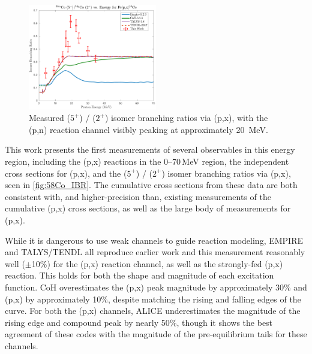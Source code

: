 \begin{figure}[h]
 \centering
 \includegraphics[width=0.5\textwidth]{./figures/58Co_IBR.pdf}
 \caption{Measured  ($5^+$) /   ($2^+$)  isomer branching ratios via (p,x), with the (p,n) reaction channel visibly peaking at approximately \mbox{20 MeV}.}
 \label{fig:58Co_IBR}
\end{figure}





This work presents the first measurements of several observables in 
this energy region, including the 
(p,x) reactions in the 0--70\,MeV region, 
the independent cross sections for      (p,x), and the  ($5^+$) /   ($2^+$)  isomer branching ratios via (p,x), seen in \autoref{fig:58Co_IBR}. 
The cumulative cross sections from these data are both consistent with, and higher-precision than, existing measurements of the cumulative (p,x) cross sections, as well as the large body of measurements for (p,x).

While it is dangerous to use weak channels to guide reaction modeling,
EMPIRE and TALYS/TENDL all reproduce earlier work and this measurement reasonably well ($\pm$10\%) for the (p,x) reaction channel, as well as the strongly-fed (p,x) reaction.
This holds for both the shape and magnitude of each excitation function.
CoH overestimates the (p,x) peak magnitude by approximately 30\% and  (p,x)  by approximately 10\%, despite matching the rising and falling edges of the curve.
For both the (p,x) channels, ALICE underestimates the magnitude of the rising edge and compound peak by nearly 50\%, though it shows the best agreement of these codes with the magnitude of the pre-equilibrium tails for these channels.

